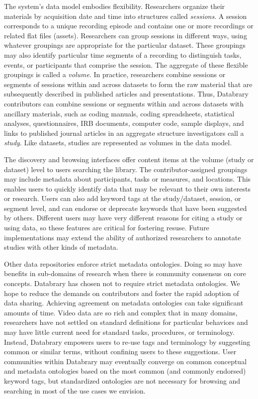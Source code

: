\documentclass[letterpaper,man,apacite]{apa6}
\begin{document}
The system's data model embodies flexibility. 
Researchers organize their materials by acquisition date and time into structures called \emph{sessions}.
A session corresponds to a unique recording episode and contains one or more recordings or related flat files (assets). 
Researchers can group sessions in different ways, using whatever groupings are appropriate for
the particular dataset. 
These groupings may also identify particular time segments of a recording to distinguish tasks, events, or
participants that comprise the session. 
The aggregate of these flexible groupings is called a \emph{volume}. 
In practice, researchers combine sessions or segments of sessions within and across datasets to form the raw material that are subsequently described in published articles and presentations. 
Thus, Databrary contributors can combine sessions or segments within and across datasets with ancillary
materials, such as coding manuals, coding spreadsheets, statistical analyses, questionnaires, IRB documents, computer code, sample displays, and links to published journal articles in an aggregate structure investigators call a \emph{study}. 
Like datasets, studies are represented as volumes in the data model.

The discovery and browsing interfaces offer content items at the volume (study or dataset) level to users searching the library. 
The contributor-assigned groupings may include metadata about participants, tasks or measures, and locations.
This enables users to quickly identify data that may be relevant to their own interests or research.
Users can also add keyword tags at the study/dataset, session, or segment level, and can endorse or deprecate keywords that have been suggested by others. 
Different users may have very different reasons for citing a study or using data, so these features are critical for fostering resuse. 
Future implementations may extend the ability of authorized researchers to annotate studies with other kinds of metadata.

Other data repositories enforce strict metadata ontologies.
Doing so may have benefits in sub-domains of research when there is community consensus on core concepts. 
Databrary has chosen not to require strict metadata ontologies. 
We hope to reduce the demands on contributors and foster the rapid adoption of data sharing.
Achieving agreement on metadata ontologies can take significant amounts of time. 
Video data are so rich and complex that in many domains, researchers have not settled on standard definitions for particular behaviors and may have little current need for standard tasks, procedures, or terminology. 
Instead, Databrary empowers users to re-use tags and terminology by suggesting common or similar terms, without confining users to these suggestions. 
User communities within Databrary may eventually converge on common conceptual and metadata ontologies based on the most common (and commonly endorsed) keyword tags, but standardized ontologies are not necessary for browsing and searching in most of the use cases we envision.
\end{document}

